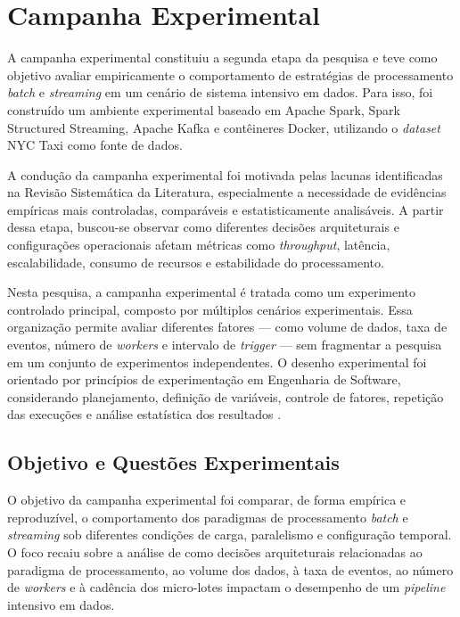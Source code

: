 \chapter{Campanha Experimental}
\label{cap:campanha-experimental}
 
A campanha experimental constituiu a segunda etapa da pesquisa e teve como objetivo avaliar empiricamente o comportamento de estratégias de processamento \textit{batch} e \textit{streaming} em um cenário de sistema intensivo em dados. Para isso, foi construído um ambiente experimental baseado em Apache Spark, Spark Structured Streaming, Apache Kafka e contêineres Docker, utilizando o \textit{dataset} NYC Taxi como fonte de dados.
 
A condução da campanha experimental foi motivada pelas lacunas identificadas na Revisão Sistemática da Literatura, especialmente a necessidade de evidências empíricas mais controladas, comparáveis e estatisticamente analisáveis. A partir dessa etapa, buscou-se observar como diferentes decisões arquiteturais e configurações operacionais afetam métricas como \textit{throughput}, latência, escalabilidade, consumo de recursos e estabilidade do processamento.
 
Nesta pesquisa, a campanha experimental é tratada como um experimento controlado principal, composto por múltiplos cenários experimentais. Essa organização permite avaliar diferentes fatores --- como volume de dados, taxa de eventos, número de \textit{workers} e intervalo de \textit{trigger} --- sem fragmentar a pesquisa em um conjunto de experimentos independentes. O desenho experimental foi orientado por princípios de experimentação em Engenharia de Software, considerando planejamento, definição de variáveis, controle de fatores, repetição das execuções e análise estatística dos resultados \cite{wohlin2012experimentation}.
 
\section{Objetivo e Questões Experimentais}
\label{sec:objetivo-questoes-experimento}
 
O objetivo da campanha experimental foi comparar, de forma empírica e reproduzível, o comportamento dos paradigmas de processamento \textit{batch} e \textit{streaming} sob diferentes condições de carga, paralelismo e configuração temporal. O foco recaiu sobre a análise de como decisões arquiteturais relacionadas ao paradigma de processamento, ao volume dos dados, à taxa de eventos, ao número de \textit{workers} e à cadência dos micro-lotes impactam o desempenho de um \textit{pipeline} intensivo em dados.
 
